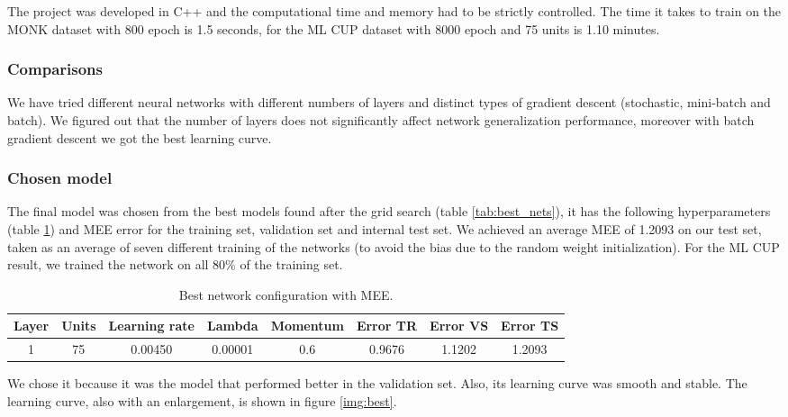 The project was developed in C++ and the computational time and memory had to be strictly controlled.
The time it takes to train on the MONK dataset with 800 epoch is 1.5 seconds, for the ML CUP dataset with 8000 epoch and 75 units is 1.10 minutes.

\subsubsection{Comparisons}
We have tried different neural networks with different numbers of layers and distinct types of gradient descent (stochastic, mini-batch and batch). We figured out that the number of layers does not significantly affect network generalization performance, moreover with batch gradient descent we got the best learning curve.

\subsubsection{Chosen model}
The final model was chosen from the best models found after the grid search (table \ref{tab:best_nets}), it has the following hyperparameters (table \ref{tab:best_net}) and MEE error for the training set, validation set and internal test set.
We achieved an average MEE of 1.2093 on our test set, taken as an average of seven
different training of the networks (to avoid the bias due to the random weight
initialization). For the ML CUP result, we trained the network on all 80\% of the training set.

\vspace{0.5cm}
\begin{center} 
\small\addtolength{\tabcolsep}{-3pt}
\begin{table}[h!]
	\centering
	\begin{tabular}{|c|c|c|c|c|c|c|c|}
		\hline
		\textbf{Layer}& \textbf{Units}& \textbf{Learning rate} & \multicolumn{1}{l|}{\textbf{Lambda}} & \textbf{Momentum} & \textbf{Error TR}& \textbf{Error VS}& \textbf{Error TS}\\ \hline
		1 & 75 & 0.00450 & 0.00001 & 0.6  & 0.9676 & 1.1202 & 1.2093  \\
		\hline
	\end{tabular}
	\caption{Best network configuration with MEE.}
	\label{tab:best_net}
\end{table}
\end{center}

We chose it because it was the model that performed better in the validation set. Also, its learning curve was smooth and stable.
The learning curve, also with an enlargement, is shown in figure \ref{img:best}.

